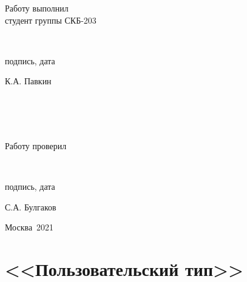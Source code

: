 \documentclass[a4paper,12pt]{article}
\begin{document}
\begin{titlepage}
\begin{flushright}
	\begin{minipage}[center]{15cm}
		\begin{minipage}[left]{5cm}
			{Работу выполнил\\студент группы СКБ-203}
		\end{minipage}
		\begin{minipage}[center]{5cm}
			\vspace{1.25cm}
			\hrulefill\\[-1cm]
			\begin{center}{подпись, дата}\end{center}
		\end{minipage}
		\begin{minipage}[right]{4cm}
			\vspace{0.4cm}
			\begin{flushright}{К.А. Павкин}\end{flushright}
		\end{minipage}
		\\
		\\
		\\
		\begin{minipage}[left]{5cm}
			{Работу проверил}
		\end{minipage}
		\begin{minipage}[center]{5cm}
			\vspace{1.25cm}
			\hrulefill\\[-1cm]
			\begin{center}{подпись, дата}\end{center}
		\end{minipage}
		\begin{minipage}[right]{4cm}
			\begin{flushright}{С.А. Булгаков}\end{flushright}
		\end{minipage}
	\end{minipage}
\end{flushright}

\vspace{\fill}

\begin{center}
	Москва~2021
\end{center}

\end{titlepage}

\tableofcontents
\cleardoublepage

\section*{<<Пользовательский тип>>}
\end{document}
